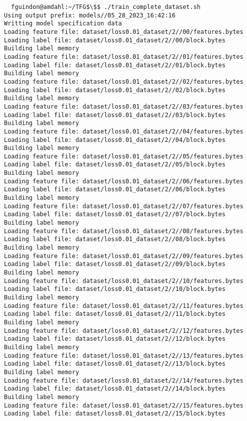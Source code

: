 \documentclass[12pt,oneside]{book}
\begin{document}
\begin{lstlisting}
  fguindon@amdahl:~/TFG$\$$ ./train_complete_dataset.sh
Using output prefix: models//05_28_2023_16:42:16
Writting model specification data
Loading feature file: dataset/loss0.01_dataset/2//00/features.bytes
Loading label file: dataset/loss0.01_dataset/2//00/block.bytes
Building label memory
Loading feature file: dataset/loss0.01_dataset/2//01/features.bytes
Loading label file: dataset/loss0.01_dataset/2//01/block.bytes
Building label memory
Loading feature file: dataset/loss0.01_dataset/2//02/features.bytes
Loading label file: dataset/loss0.01_dataset/2//02/block.bytes
Building label memory
Loading feature file: dataset/loss0.01_dataset/2//03/features.bytes
Loading label file: dataset/loss0.01_dataset/2//03/block.bytes
Building label memory
Loading feature file: dataset/loss0.01_dataset/2//04/features.bytes
Loading label file: dataset/loss0.01_dataset/2//04/block.bytes
Building label memory
Loading feature file: dataset/loss0.01_dataset/2//05/features.bytes
Loading label file: dataset/loss0.01_dataset/2//05/block.bytes
Building label memory
Loading feature file: dataset/loss0.01_dataset/2//06/features.bytes
Loading label file: dataset/loss0.01_dataset/2//06/block.bytes
Building label memory
Loading feature file: dataset/loss0.01_dataset/2//07/features.bytes
Loading label file: dataset/loss0.01_dataset/2//07/block.bytes
Building label memory
Loading feature file: dataset/loss0.01_dataset/2//08/features.bytes
Loading label file: dataset/loss0.01_dataset/2//08/block.bytes
Building label memory
Loading feature file: dataset/loss0.01_dataset/2//09/features.bytes
Loading label file: dataset/loss0.01_dataset/2//09/block.bytes
Building label memory
Loading feature file: dataset/loss0.01_dataset/2//10/features.bytes
Loading label file: dataset/loss0.01_dataset/2//10/block.bytes
Building label memory
Loading feature file: dataset/loss0.01_dataset/2//11/features.bytes
Loading label file: dataset/loss0.01_dataset/2//11/block.bytes
Building label memory
Loading feature file: dataset/loss0.01_dataset/2//12/features.bytes
Loading label file: dataset/loss0.01_dataset/2//12/block.bytes
Building label memory
Loading feature file: dataset/loss0.01_dataset/2//13/features.bytes
Loading label file: dataset/loss0.01_dataset/2//13/block.bytes
Building label memory
Loading feature file: dataset/loss0.01_dataset/2//14/features.bytes
Loading label file: dataset/loss0.01_dataset/2//14/block.bytes
Building label memory
Loading feature file: dataset/loss0.01_dataset/2//15/features.bytes
Loading label file: dataset/loss0.01_dataset/2//15/block.bytes

\end{lstlisting}
\end{document}

